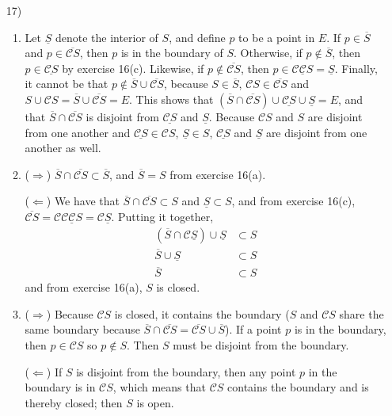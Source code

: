 \documentclass[a4paper,12pt]{article}
\begin{document}
\begin{enumerate}
        \item[17)]
            \begin{enumerate}
                \item
                    Let $\underline{S}$ denote the interior of $S$, and define $p$ to be a point in $E$. If $p \in \overline{S}$ and $p \in \overline{\mathcal{C} S}$, then $p$ is in the boundary of $S$. Otherwise, if $p \notin \overline{S}$, then $p \in \underline{\mathcal{C}S}$ by exercise 16(c). Likewise, if $p \notin \overline{\mathcal{C} S}$, then $p \in \underline{\mathcal{C} \mathcal{C} S} = \underline{S}$. Finally, it cannot be that $p \notin \overline{S} \cup \overline{\mathcal{C} S}$, because $S \in \overline{S}$, $\mathcal{C} S \in \overline{\mathcal{C} S}$ and $S \cup \mathcal{C} S = \overline{S} \cup \overline{\mathcal{C} S} = E$. This shows that $(\overline{S} \cap \overline{\mathcal{C} S}) \cup \underline{\mathcal{C} S} \cup \underline{S} = E$, and that $\overline{S} \cap \overline{\mathcal{C} S}$ is disjoint from $\underline{\mathcal{C} S}$ and $\underline{S}$. Because $\mathcal{C} S$ and $S$ are disjoint from one another and $\underline{\mathcal{C} S} \in \mathcal{C} S$, $\underline{S} \in S$, $\underline{\mathcal{C} S}$ and $\underline{S}$ are disjoint from one another as well.

                \item
                    ($\Rightarrow$) $\overline{S} \cap \overline{\mathcal{C} S} \subset \overline{S}$, and $\overline{S} = S$ from exercise 16(a). \par
                    ($\Leftarrow$) We have that $\overline{S} \cap \overline{\mathcal{C} S} \subset S$ and $\underline{S} \subset S$, and from exercise 16(c), $\overline{\mathcal{C} S} = \mathcal{C} \underline{\mathcal{C} \mathcal{C} S} = \mathcal{C} \underline{S}$. Putting it together,
                    \begin{align*}
                        (\overline{S} \cap \mathcal{C} \underline{S}) \cup \underline{S} &\subset S \\
                        \overline{S} \cup \underline{S} &\subset S \\
                        \overline{S} &\subset S
                    \end{align*}
                    and from exercise 16(a), $S$ is closed.

                \item
                    ($\Rightarrow$) Because $\mathcal{C} S$ is closed, it contains the boundary ($S$ and $\mathcal{C} S$ share the same boundary because $\overline{S} \cap \overline{\mathcal{C} S} = \overline{\mathcal{C} S} \cup \overline{S}$). If a point $p$ is in the boundary, then $p \in \mathcal{C} S$ so $p \notin S$. Then $S$ must be disjoint from the boundary. \par
                    ($\Leftarrow$) If $S$ is disjoint from the boundary, then any point $p$ in the boundary is in $\mathcal{C} S$, which means that $\mathcal{C} S$ contains the boundary and is thereby closed; then $S$ is open.
            \end{enumerate}


\end{enumerate}
\end{document}
